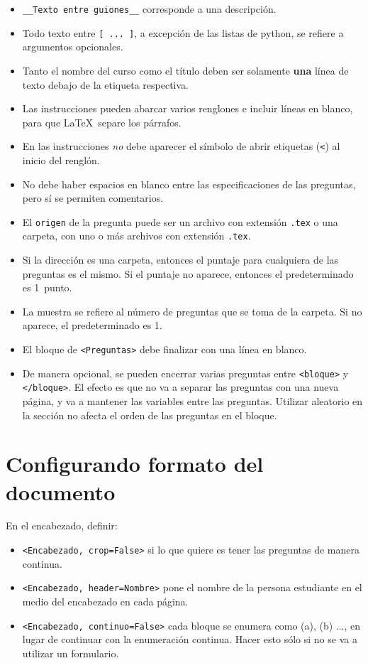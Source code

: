\documentclass[12pt]{article}
\theoremstyle{definition}
\begin{document}
\begin{itemize}
  \item \verb|__Texto entre guiones__| corresponde a una descripción.
  \item Todo texto entre \verb|[ ... ]|, a excepción de las listas de python, se refiere a argumentos opcionales.
  \item Tanto el nombre del curso como el título deben ser solamente \textbf{una} línea de texto debajo de la etiqueta respectiva.
  \item Las instrucciones pueden abarcar varios renglones e incluir líneas en blanco, para que \LaTeX\ separe los párrafos. 
  \item En las instrucciones \emph{no} debe aparecer el símbolo de abrir etiquetas (\verb|<|) al inicio del renglón.
  \item No debe haber espacios en blanco entre las especificaciones de las preguntas, pero sí se permiten comentarios.
  \item El \verb|origen| de la pregunta puede ser un archivo con extensión \verb|.tex| o una carpeta, con uno o más archivos con extensión \verb|.tex|.
  \item Si la dirección es una carpeta, entonces el puntaje para cualquiera de las preguntas es el mismo. Si el puntaje no aparece, entonces el predeterminado es 1~punto.
  \item La muestra se refiere al número de preguntas que se toma de la carpeta. Si no aparece, el predeterminado es 1.
  \item El bloque de \verb|<Preguntas>| debe finalizar con una línea en blanco.
  \item De manera opcional, se pueden encerrar varias preguntas entre \verb|<bloque>| y \verb|</bloque>|. El efecto es que no va a separar las preguntas con una nueva página, y va a mantener las variables entre las preguntas. Utilizar aleatorio en la sección no afecta el orden de las preguntas en el bloque.
\end{itemize}

\section{Configurando formato del documento}
En el encabezado, definir: 
\begin{itemize}
  \item \verb|<Encabezado, crop=False>|
si lo que quiere es tener las preguntas de manera continua.
\item \verb|<Encabezado, header=Nombre>| 
pone el nombre de la persona estudiante en el medio del encabezado en cada p\'agina.
\item \verb|<Encabezado, continuo=False>| 
cada bloque se enumera como (a), (b) ..., en lugar de continuar con la enumeraci\'on continua. Hacer esto s\'olo si no se va a utilizar un formulario.
\end{itemize}
\medskip
\end{document}
